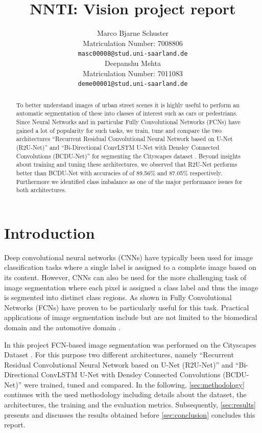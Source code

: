 \documentclass{article}
\title{NNTI: Vision project report}
\author{%
  Marco Bjarne Schuster\\
  Matriculation Number: 7008806\\
  \texttt{masc00008@stud.uni-saarland.de} \\
  \And
  Deepanshu Mehta\\
  Matriculation Number: 7011083\\
  \texttt{deme00001@stud.uni-saarland.de} \\
}
\begin{document}
\maketitle

\begin{abstract}
    To better understand images of urban street scenes it is highly useful to 
    perform an automatic segmentation of these into classes of interest such as 
    cars or pedestrians. Since Neural Networks and in particular Fully 
    Convolutional Networks (FCNs) have gained a lot of popularity for such 
    tasks, we train, tune and compare the two architectures ``Recurrent 
    Residual Convolutional Neural Network based on U-Net (R2U-Net)'' 
    \autocite{R2UNet} and ``Bi-Directional ConvLSTM 
    U-Net with Densley Connected Convolutions (BCDU-Net)'' \autocite{BCDUNet} 
    for segmenting the Cityscapes dataset \autocite{Cordts2016Cityscapes}. 
    Beyond insights about training and tuning these architectures, we observed 
    that R2U-Net performs better than BCDU-Net with accuracies of 
    of 89.56\% and 87.05\% respectively. Furthermore we identified class 
    imbalance as one of the major performance issues for both architectures.
\end{abstract}

\section{Introduction}
Deep convolutional neural networks (CNNs) have typically been used for image
classification tasks where a single label is assigned to a complete image based 
on its 
content. However, CNNs can also be used for the more challenging task of image 
segmentation where each pixel is assigned a class label and thus the image is 
segmented into distinct class regions. As shown in \autocite{FullyConv} Fully 
Convolutional Networks (FCNs) have proven to be particularly useful for this 
task. Practical applications of image segmentation include but are not limited 
to the biomedical domain \autocite{UNet} \autocite{R2UNet} 
\autocite{BCDUNet} and the automotive domain \autocite{tao2020hierarchical}.
\autocite[1]{UNet}

In this project FCN-based image segmentation was performed on the Cityscapes 
Dataset \autocite{Cordts2016Cityscapes}. For this purpose two different 
architectures, namely  ``Recurrent Residual Convolutional 
Neural Network based on U-Net (R2U-Net)'' \autocite{R2UNet} and 
``Bi-Directional ConvLSTM U-Net with Densley 
Connected Convolutions (BCDU-Net)'' \autocite{BCDUNet} were trained, tuned and 
compared. In the following, \autoref{sec:methodology} continues with the used 
methodology including details about the dataset, the architectures, the 
training and the evaluation metrics. Subsequently, \autoref{sec:results} 
presents and discusses the results obtained before \autoref{sec:conclusion} 
concludes this report.
\end{document}
